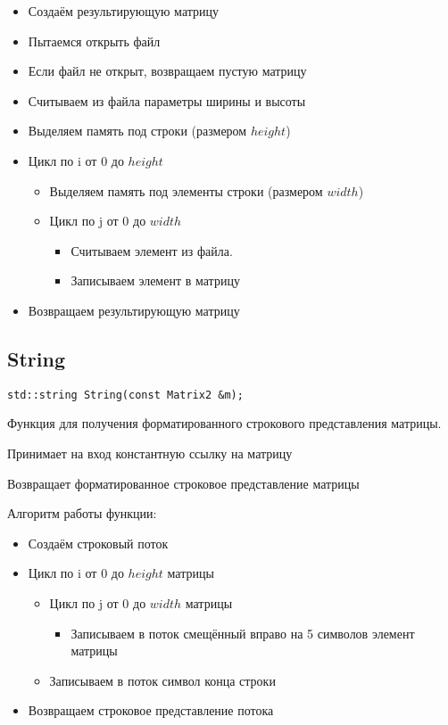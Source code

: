 \begin{itemize}
	\item Создаём результирующую матрицу
	\item Пытаемся открыть файл
	\item Если файл не открыт, возвращаем пустую матрицу
	\item Считываем из файла параметры ширины и высоты
	\item Выделяем память под строки (размером $ height $)
	\item Цикл по i от 0 до $ height $
	\begin{itemize}
		\item Выделяем память под элементы строки (размером $ width $)
		\item Цикл по j от 0 до $ width $
		\begin{itemize}
			\item Считываем элемент из файла.
			\item Записываем элемент в матрицу
		\end{itemize}
	\end{itemize}
	\item Возвращаем результирующую матрицу
\end{itemize}

\subsection*{String}

\begin{lstlisting}[label={lst:String}]
	std::string String(const Matrix2 &m);
\end{lstlisting}

Функция для получения форматированного строкового представления матрицы.

Принимает на вход константную ссылку на матрицу

Возвращает форматированное строковое представление матрицы

Алгоритм работы функции:

\begin{itemize}
	\item Создаём строковый поток
	\item Цикл по i от 0 до $ height $ матрицы
	\begin{itemize}
		\item Цикл по j от 0 до $ width $ матрицы
		\begin{itemize}
			\item Записываем в поток смещённый вправо на 5 символов элемент матрицы
		\end{itemize}
		\item Записываем в поток символ конца строки
	\end{itemize}
	\item Возвращаем строковое представление потока
\end{itemize}

